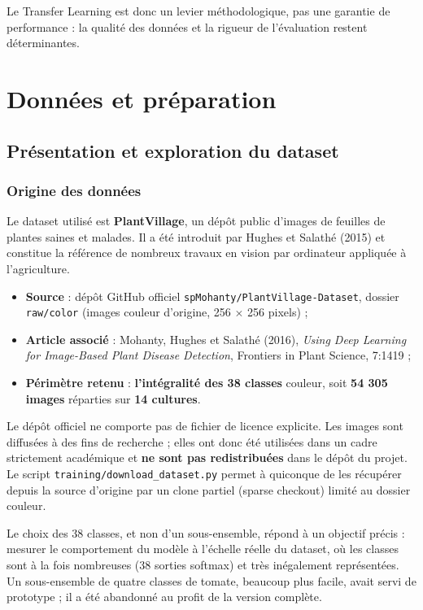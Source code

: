 \documentclass[10pt,a4paper]{article}
\begin{document}
Le Transfer Learning est donc un levier méthodologique, pas une garantie de performance : la qualité des données et la rigueur de l'évaluation restent déterminantes.

\clearpage

\section{Données et préparation}
\label{sec:3}%

\subsection{Présentation et exploration du dataset}

\subsubsection{Origine des données}

Le dataset utilisé est \textbf{PlantVillage}, un dépôt public d'images de feuilles de plantes saines et malades. Il a été introduit par Hughes et Salathé (2015) et constitue la référence de nombreux travaux en vision par ordinateur appliquée à l'agriculture.

\begin{itemize}
\item \textbf{Source} : dépôt GitHub officiel \texttt{spMohanty/\allowbreak{}PlantVillage-Dataset}, dossier \texttt{raw/\allowbreak{}color} (images couleur d'origine, 256 $\times$ 256 pixels) ;
\item \textbf{Article associé} : Mohanty, Hughes et Salathé (2016), \emph{Using Deep Learning for Image-Based Plant Disease Detection}, Frontiers in Plant Science, 7:1419 ;
\item \textbf{Périmètre retenu} : \textbf{l'intégralité des 38 classes} couleur, soit \textbf{54 305 images} réparties sur \textbf{14 cultures}.
\end{itemize}

Le dépôt officiel ne comporte pas de fichier de licence explicite. Les images sont diffusées à des fins de recherche ; elles ont donc été utilisées dans un cadre strictement académique et \textbf{ne sont pas redistribuées} dans le dépôt du projet. Le script \texttt{training/\allowbreak{}download\_\allowbreak{}dataset.py} permet à quiconque de les récupérer depuis la source d'origine par un clone partiel (sparse checkout) limité au dossier couleur.

Le choix des 38 classes, et non d'un sous-ensemble, répond à un objectif précis : mesurer le comportement du modèle à l'échelle réelle du dataset, où les classes sont à la fois nombreuses (38 sorties softmax) et très inégalement représentées. Un sous-ensemble de quatre classes de tomate, beaucoup plus facile, avait servi de prototype ; il a été abandonné au profit de la version complète.
\end{document}

